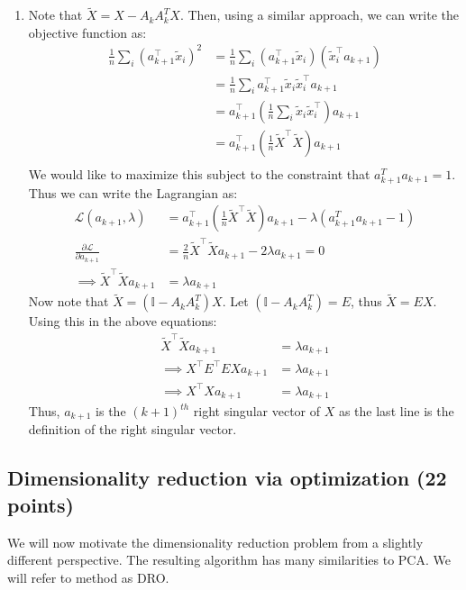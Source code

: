 \documentclass[a4paper]{article}
\newcounter{thm}
\theoremstyle{definition}
\begin{document}
\begin{enumerate}
    \item Note that $\tilde{X} = X - A_kA_k^TX$. Then, using a similar approach, we can write the objective function as:
    \begin{align*}
        \frac{1}{n} \sum_i (a_{k+1}^\top \tilde{x}_i)^2 &= \frac{1}{n} \sum_i (a_{k+1}^\top \tilde{x}_i)(\tilde{x}_i^\top a_{k+1})\\
        &= \frac{1}{n} \sum_i a_{k+1}^\top \tilde{x}_i \tilde{x}_i^\top a_{k+1}\\
        &= a_{k+1}^\top \left(\frac{1}{n} \sum_i \tilde{x}_i \tilde{x}_i^\top \right) a_{k+1}\\
        &= a_{k+1}^\top \left(\frac{1}{n} \tilde{X}^\top \tilde{X} \right) a_{k+1} \\
    \end{align*}
    We would like to maximize this subject to the constraint that $a_{k+1}^Ta_{k+1} = 1$. Thus we can write the Lagrangian as:
    \begin{align*}
        \mathcal{L}(a_{k+1}, \lambda) &= a_{k+1}^\top \left(\frac{1}{n} \tilde{X}^\top \tilde{X} \right) a_{k+1} - \lambda(a_{k+1}^Ta_{k+1} - 1)\\
        \frac{\partial \mathcal{L}}{\partial a_{k+1}} &= \frac{2}{n} \tilde{X}^\top \tilde{X} a_{k+1} - 2\lambda a_{k+1} = 0\\
        \implies \tilde{X}^\top \tilde{X} a_{k+1} &= \lambda a_{k+1}
    \end{align*}
    Now note that $\tilde{X} = (\mathbb{I} - A_kA_k^T)X$. Let $(\mathbb{I} - A_kA_k^T) = E$, thus $\tilde{X} = EX$. Using this in the above equations:
    \begin{align*}
        \tilde{X}^\top \tilde{X} a_{k+1} &= \lambda a_{k+1}\\
        \implies X^\top E^\top E X a_{k+1} &= \lambda a_{k+1}\\
        \implies X^\top X a_{k+1} &= \lambda a_{k+1}
    \end{align*}
    Thus, $a_{k+1}$ is the $(k+1)^{th}$ right singular vector of $X$ as the last line is the definition of the right singular vector.

\end{enumerate}


\subsection{Dimensionality reduction via optimization (22 points)}

We will now motivate the dimensionality reduction problem from a slightly different
perspective. The resulting algorithm has many similarities to PCA.
We will refer to method as DRO.
\end{document}
